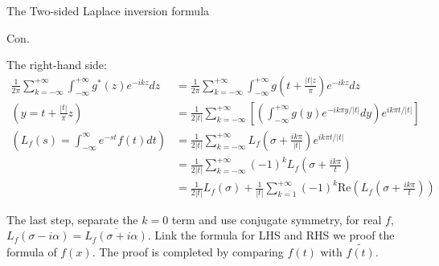 \documentclass{beamer}
\begin{document}
\begin{frame}{The Two-sided Laplace inversion formula}


    {\footnotesize \scriptsize
    \par Con.
    \par The right-hand side:
    \begin{align*}
       \frac{1}{2\pi} \sum_{k=-\infty}^{+\infty} \int_{-\infty}^{+\infty} g^*(z)e^{-ikz} dz &= 
       \frac{1}{2\pi} \sum_{k=-\infty}^{+\infty} \int_{-\infty}^{+\infty} g\left( t + \frac{|t|z}{\pi} \right) e^{-ikz} dz\\
       \left(y = t+\frac{|t|}{\pi}z\right)&= \frac{1}{2|t|} \sum_{k=-\infty}^{+\infty} \left[ \left( \int_{-\infty}^{+\infty} g(y)e^{-ik\pi y/|t|} dy \right) e^{ik\pi t/|t|} \right]\\
       \left( L_f(s) = \int_{-\infty}^{\infty} e^{-st}f(t)  dt\right)& = \frac{1}{2|t|} \sum_{k=-\infty}^{+\infty} L_f \left( \sigma + \frac{ik\pi}{|t|} \right) e^{ik\pi t/|t|}\\
       & = \frac{1}{2|t|} \sum_{k=-\infty}^{+\infty} (-1)^k L_f \left( \sigma + \frac{ik\pi}{t} \right)\\
       & = \frac{1}{2|t|} L_f(\sigma) + \frac{1}{|t|} \sum_{k=1}^{+\infty} (-1)^k \text{Re} \left( L_f \left( \sigma + \frac{ik\pi}{t} \right) \right)
    \end{align*}
    \par \pause  The last step, separate the $k=0$ term and use conjugate 
    symmetry, for real \( f \), \( L_f(\sigma - i\alpha) = \overline{L_f(\sigma + i\alpha)} \). Link the formula for LHS and RHS we proof the formula of $f(x)$. 
    The proof is completed by comparing $f(t)$ with $\tilde{f(t)}$.

    }
    
\end{frame}
\end{document}
